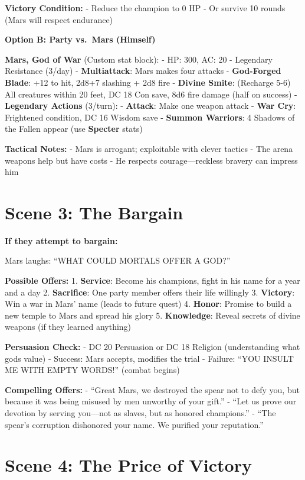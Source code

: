 \documentclass[
]{book}
\begin{document}
\textbf{Victory Condition:} - Reduce the champion to 0 HP - Or survive
10 rounds (Mars will respect endurance)

\textbf{Option B: Party vs.~Mars (Himself)}

\textbf{Mars, God of War} (Custom stat block): - HP: 300, AC: 20 -
Legendary Resistance (3/day) - \textbf{Multiattack}: Mars makes four
attacks - \textbf{God-Forged Blade}: +12 to hit, 2d8+7 slashing + 2d8
fire - \textbf{Divine Smite}: (Recharge 5-6) All creatures within 20
feet, DC 18 Con save, 8d6 fire damage (half on success) -
\textbf{Legendary Actions} (3/turn): - \textbf{Attack}: Make one weapon
attack - \textbf{War Cry}: Frightened condition, DC 16 Wisdom save -
\textbf{Summon Warriors}: 4 Shadows of the Fallen appear (use
\textbf{Specter} stats)

\textbf{Tactical Notes:} - Mars is arrogant; exploitable with clever
tactics - The arena weapons help but have costs - He respects
courage---reckless bravery can impress him

\section{Scene 3: The Bargain}\label{scene-3-the-bargain}

\textbf{If they attempt to bargain:}

Mars laughs: ``WHAT COULD MORTALS OFFER A GOD?''

\textbf{Possible Offers:} 1. \textbf{Service}: Become his champions,
fight in his name for a year and a day 2. \textbf{Sacrifice}: One party
member offers their life willingly 3. \textbf{Victory}: Win a war in
Mars' name (leads to future quest) 4. \textbf{Honor}: Promise to build a
new temple to Mars and spread his glory 5. \textbf{Knowledge}: Reveal
secrets of divine weapons (if they learned anything)

\textbf{Persuasion Check:} - DC 20 Persuasion or DC 18 Religion
(understanding what gods value) - Success: Mars accepts, modifies the
trial - Failure: ``YOU INSULT ME WITH EMPTY WORDS!'' (combat begins)

\textbf{Compelling Offers:} - ``Great Mars, we destroyed the spear not
to defy you, but because it was being misused by men unworthy of your
gift.'' - ``Let us prove our devotion by serving you---not as slaves,
but as honored champions.'' - ``The spear's corruption dishonored your
name. We purified your reputation.''

\section{Scene 4: The Price of
Victory}\label{scene-4-the-price-of-victory}
\end{document}
